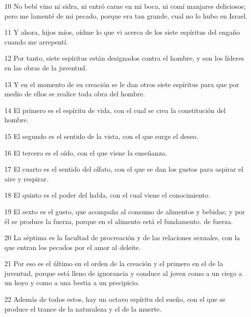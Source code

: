 \par 10 No bebí vino ni sidra, ni entró carne en mi boca, ni comí manjares deliciosos; pero me lamenté de mi pecado, porque era tan grande, cual no lo hubo en Israel.

\par 11 Y ahora, hijos míos, oídme lo que vi acerca de los siete espíritus del engaño cuando me arrepentí.

\par 12 Por tanto, siete espíritus están designados contra el hombre, y son los líderes en las obras de la juventud.

\par 13 Y en el momento de su creación se le dan otros siete espíritus para que por medio de ellos se realice toda obra del hombre.

\par 14 El primero es el espíritu de vida, con el cual se crea la constitución del hombre.

\par 15 El segundo es el sentido de la vista, con el que surge el deseo.

\par 16 El tercero es el oído, con el que viene la enseñanza.

\par 17 El cuarto es el sentido del olfato, con el que se dan los gustos para aspirar el aire y respirar.

\par 18 El quinto es el poder del habla, con el cual viene el conocimiento.

\par 19 El sexto es el gusto, que acompaña al consumo de alimentos y bebidas; y por él se produce la fuerza, porque en el alimento está el fundamento. de fuerza.

\par 20 La séptima es la facultad de procreación y de las relaciones sexuales, con la que entran los pecados por el amor al deleite.

\par 21 Por eso es el último en el orden de la creación y el primero en el de la juventud, porque está lleno de ignorancia y conduce al joven como a un ciego a un hoyo y como a una bestia a un precipicio.

\par 22 Además de todos estos, hay un octavo espíritu del sueño, con el que se produce el trance de la naturaleza y el de la muerte.

